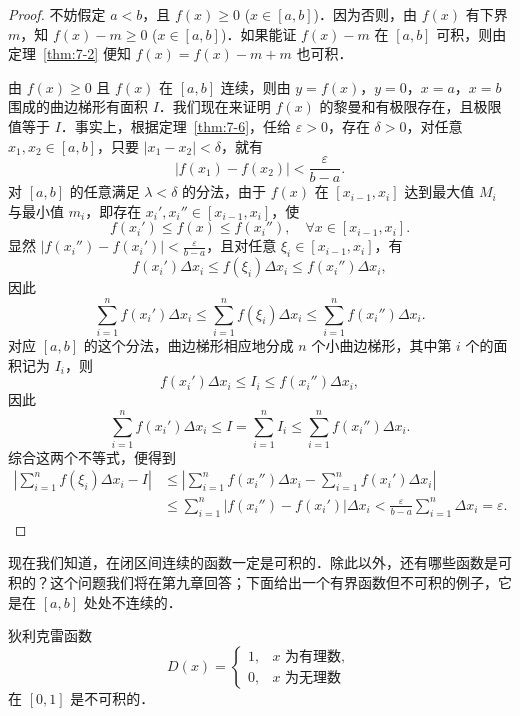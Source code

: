 \begin{proof}
不妨假定 $a < b$，且 $f(x) \geqslant 0$ ($x \in [a, b]$)．因为否则，由 $f(x)$ 有下界 $m$，知 $f(x) - m \geqslant 0$ ($x \in [a, b]$)．如果能证 $f(x) - m$ 在 $[a, b]$ 可积，则由定理~\ref{thm:7-2} 便知 $f(x) = f(x) - m + m$ 也可积．

由 $f(x) \geqslant 0$ 且 $f(x)$ 在 $[a,b]$ 连续，则由 $y = f(x)$，$y = 0$，$x = a$，$x = b$ 围成的曲边梯形有面积 $I$．我们现在来证明 $f(x)$ 的黎曼和有极限存在，且极限值等于 $I$．事实上，根据定理~\ref{thm:7-6}，任给 $\varepsilon > 0$，存在 $\delta > 0$，对任意 $x_1, x_2 \in [a,b]$，只要 $|x_1 - x_2| < \delta$，就有
\[
|f(x_1) - f(x_2)| < \frac{\varepsilon}{b - a}.
\]
对 $[a,b]$ 的任意满足 $\lambda < \delta$ 的分法，由于 $f(x)$ 在 $[x_{i-1}, x_i]$ 达到最大值 $M_i$ 与最小值 $m_i$，即存在 $x_i', x_i'' \in [x_{i-1}, x_i]$，使
\[
f(x_i') \leqslant f(x) \leqslant f(x_i''), \quad \forall x \in [x_{i-1}, x_i].
\]
显然 $|f(x_i'') - f(x_i')| < \frac{\varepsilon}{b - a}$，且对任意 $\xi_i \in [x_{i-1}, x_i]$，有
\[
f(x_i')\Delta x_i \leqslant f(\xi_i)\Delta x_i \leqslant f(x_i'')\Delta x_i,
\]
因此
\[
\sum_{i=1}^n f(x_i')\Delta x_i \leqslant \sum_{i=1}^n f(\xi_i)\Delta x_i \leqslant \sum_{i=1}^n f(x_i'')\Delta x_i.
\]
对应 $[a,b]$ 的这个分法，曲边梯形相应地分成 $n$ 个小曲边梯形，其中第 $i$ 个的面积记为 $I_i$，则
\[
f(x_i')\Delta x_i \leqslant I_i \leqslant f(x_i'')\Delta x_i,
\]
因此
\[
\sum_{i=1}^n f(x_i')\Delta x_i \leqslant I = \sum_{i=1}^n I_i \leqslant \sum_{i=1}^n f(x_i'')\Delta x_i.
\]
综合这两个不等式，便得到
\begin{align*}
\left|\sum_{i=1}^n f(\xi_i)\Delta x_i - I\right| &\leqslant \left|\sum_{i=1}^n f(x_i'')\Delta x_i - \sum_{i=1}^n f(x_i')\Delta x_i\right| \\
&\leqslant \sum_{i=1}^n |f(x_i'') - f(x_i')|\Delta x_i < \frac{\varepsilon}{b - a}\sum_{i=1}^n \Delta x_i = \varepsilon.
\end{align*}
\end{proof}

现在我们知道，在闭区间连续的函数一定是可积的．除此以外，还有哪些函数是可积的？这个问题我们将在第九章回答；下面给出一个有界函数但不可积的例子，它是在 $[a,b]$ 处处不连续的．

\begin{example}
狄利克雷函数
\[
D(x) = \begin{cases}
1, & x \text{ 为有理数}, \\
0, & x \text{ 为无理数}
\end{cases}
\]
在 $[0,1]$ 是不可积的．
\end{example}

